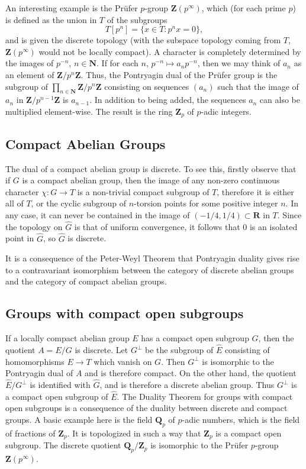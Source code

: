 \documentclass[11pt]{amsart}
\numberwithin{equation}{section}
\theoremstyle{plain}
\theoremstyle{definition}
\newcommand{\N}{\mathbf N}
\newcommand{\Q}{\mathbf Q}
\newcommand{\R}{\mathbf R}
\newcommand{\Z}{\mathbf Z}
\begin{document}
An interesting example is the Pr\"ufer $p$-group $\Z(p^\infty)$, which (for each prime $p$) is defined as the union in $T$ of the subgroups
\begin{equation*}
  T[p^n]=\{x\in T: p^n x=0\},
\end{equation*}
and is given the discrete topology (with the subspace topology coming from $T$, $\Z(p^\infty)$ would not be locally compact).
A character is completely determined by the images of $p^{-n}$, $n\in \N$.
If for each $n$, $p^{-n}\mapsto a_n p^{-n}$, then we may think of $a_n$ as an element of $\Z/p^n\Z$.
Thus, the Pontryagin dual of the Pr\"ufer group is the subgroup of $\prod_{n\in \N}\Z/p^n\Z$ consisting on sequences $(a_n)$ such that the image of $a_n$ in $\Z/p^{n-1}\Z$ is $a_{n-1}$.
In addition to being added, the sequences $a_n$ can also be multiplied element-wise.
The result is the ring $\Z_p$ of $p$-adic integers.
\subsection{Compact Abelian Groups}
\label{sec:compact}
The dual of a compact abelian group is discrete.
To see this, firstly observe that if $G$ is a compact abelian group, then the image of any non-zero continuous character $\chi:G\to T$ is a non-trivial compact subgroup of $T$, therefore it is either all of $T$, or the cyclic subgroup of $n$-torsion points for some positive integer $n$.
In any case, it can never be contained in the image of $(-1/4,1/4)\subset \R$ in $T$.
Since the topology on $\hat G$ is that of uniform convergence, it follows that $0$ is an isolated point in $\hat G$, so $\hat G$ is discrete.

It is a consequence of the Peter-Weyl Theorem that Pontryagin duality gives rise to a contravariant isomorphism between the category of discrete abelian groups and the category of compact abelian groups.
\subsection{Groups with compact open subgroups}
\label{sec:groups-with-compact}
If a locally compact abelian group $E$ has a compact open subgroup $G$, then the quotient $A=E/G$ is discrete.
Let $G^\perp$ be the subgroup of $\hat E$ consisting of homomorphisms $E\to T$ which vanish on $G$.
Then $G^\perp$ is isomorphic to the Pontryagin dual of $A$ and is therefore compact.
On the other hand, the quotient $\hat E/G^\perp$ is identified with $\hat G$, and is therefore a discrete abelian group.
Thus $G^\perp$ is a compact open subgroup of $\hat E$.
The Duality Theorem for groups with compact open subgroups is a consequence of the duality between discrete and compact groups.
A basic example here is the field $\Q_p$ of $p$-adic numbers, which is the field of fractions of $\Z_p$.
It is topologized in such a way that $\Z_p$ is a compact open subgroup.
The discrete quotient $\Q_p/\Z_p$ is isomorphic to the Pr\"ufer $p$-group $\Z(p^\infty)$.
\end{document}
